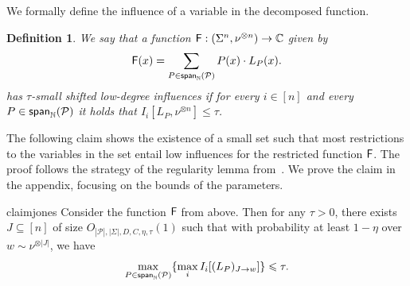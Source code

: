 \documentclass[10pt,a4paper]{amsart}
\newtheorem{definition}[thm]{Definition}
\newcommand\spn{{\sf span}_{\mathbb{N}}}
\renewcommand\leq{\leqslant}
\newcommand{\V}[1]{{#1}}
\begin{document}
We formally define the influence of a variable in the decomposed function. 

\begin{definition}
    We say that a function ${\mathsf{F}}: (\Sigma^n, \nu^{\otimes n})\rightarrow \mathbb{C}$ given by 
     \[
	\fcoarsedecomposed(\V x) = \sum\limits_{P\in\spn(\mathcal{P})} P(\V x) \cdot L_P(\V x).
	\]
    has $\tau$-small shifted low-degree influences if for every $i\in [n]$  and every $P\in\spn(\mathcal{P})$ it holds that $I_i[L_P, \nu^{\otimes n}]\leq \tau$.
\end{definition}

The following claim shows the existence of a small set such that most restrictions to the variables in the set entail low influences for the restricted function ${\mathsf{F}}$.   The proof follows the strategy of the regularity lemma from~\cite{Jones}. We prove the claim in the appendix, focusing on the bounds of the parameters.

\begin{restatable}{claim}{jones}\label{claim:influence_removal}
    Consider the function  ${\mathsf{F}}$ from above. Then for any $\tau>0$, there exists $J\subseteq [n]$ of size $O_{|\mathcal{P}|, |\Sigma|, D, C,\eta, \tau}(1)$ such that with probability at least $1-\eta$ over  $\V w\sim \nu^{\otimes |J|}$, we have
    $$ \max_{P\in \spn(\mathcal{P})} \{ \max_i I_i[(L_P)_{J\rightarrow \V w}]\}\leq \tau.$$
\end{restatable}
\end{document}
